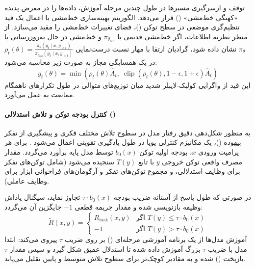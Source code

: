 توقف و ازسرگیری مسیرها در طول چندین مرحله آموزش، داده‌ها را در معرض پدیده «کهنگی خط‌مشی» () قرار می‌دهد. الگوریتم بهینه‌سازی خط‌مشی با اعمال یک قید تنظیم‌گری موضعی در سطح توکن ()، فضای تغییرات خط‌مشی را مقید می‌سازد. از منظر نظریه اطلاعات، اگر خط‌مشی قدیمی با $\pi_{\theta_{\text{old}}}$ و خط‌مشی در حال به‌روزرسانی با $\pi_\theta$ نشان داده شود، گرادیان ارتقا با مهار نسبت درست‌نمایی $\rho_t(\theta) = \frac{\pi_\theta(y_t \mid x, y_{<t})}{\pi_{\theta_{\text{old}}}(y_t \mid x, y_{<t})}$ در یک همسایگی مجاز به صورت زیر محاسبه می‌شود:
\begin{equation}
    g_t(\theta) = \min \left( \rho_t(\theta) \hat{A}_t, \; \operatorname{clip}(\rho_t(\theta), 1-\epsilon, 1+\epsilon) \hat{A}_t \right)
\end{equation}
این قید از واگرایی کولبک-لایبلر شدید میان توزیع‌های متوالی در طول تکرارهای ناهمگام ممانعت به عمل می‌آورد.

\paragraph*{کنترل بودجه توکن و تلاش استدلالی ()}
به منظور شکل‌دهی دقیق رفتار مدل در سطوح تلاش مختلف فکری و پیشگیری از تفکر بیهوده ()، یک مکانیزم کنترلی پویا در طول یادگیری تقویتی اعمال می‌شود \cite{kimi2026k25}. برای هر پرامپت ورودی $x$، بودجه اولیه توکن $b_0(x)$ توسط مدل پایه برآورد می‌گردد. مقدار مصرف واقعی توکن خروجی $y$ با تابع $T(y)$ سنجیده می‌شود (شامل توکن‌های تفکر برای وظایف استدلالی، و مجموع توکن‌های تفکر و آرگومان‌های فراخوانی ابزار برای وظایف عاملی). 

در صورتی که طول پاسخ از آستانه ضریب بودجه $\tau \cdot b_0(x)$ تجاوز نماید، سیگنال پاداش وظیفه بازنویسی شده و مقدار جریمه قطعی $-1$ جایگزین آن می‌گردد:
\begin{equation}
    \widetilde{R}(x, y) = \begin{cases} 
        R_{\text{task}}(x, y) & \text{اگر } T(y) \le \tau \cdot b_0(x) \\
        -1 & \text{اگر } T(y) > \tau \cdot b_0(x)
    \end{cases}
\end{equation}
آموزش مدل‌ها از یک برنامه آموزشی مرحله‌ای () بر روی ضریب $\tau$ پیروی می‌کند: ابتدا مدل با ضریب $\tau$ بزرگ آموزش داده شده تا استدلال عمیق شکل گیرد و سپس مقدار $\tau$ بازپخت () شده و به مقادیر کوچک‌تر برای سطوح تلاش متوسط و پایین تقلیل می‌یابد.

